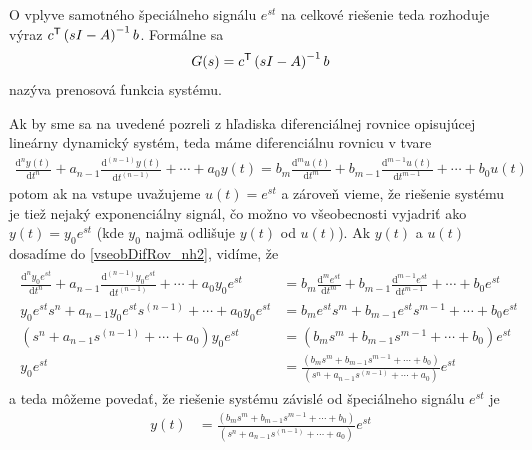 \documentclass[a4paper, 10pt, ]{article}
\begin{document}
O vplyve samotného špeciálneho signálu $e^{st}$ na celkové riešenie teda rozhoduje výraz $c^{\mathsf{T}}  \left( sI - A \right)^{-1}  b$. Formálne sa
\begin{align}
	G(s) = c^{\mathsf{T}}  \left( sI - A \right)^{-1}  b
\end{align}
nazýva prenosová funkcia systému.



\bigskip

Ak by sme sa na uvedené pozreli z hľadiska diferenciálnej rovnice opisujúcej lineárny dynamický systém, teda máme diferenciálnu rovnicu v tvare
\begin{align} \label{vseobDifRov_nh2}
	\frac{\text{d}^n y(t)}{\text{d}t^n} + a_{n-1} \frac{\text{d}^{(n-1)} y(t)}{\text{d}t^{(n-1)}} + \cdots + a_0 y(t) = b_m \frac{\text{d}^m u(t)}{\text{d}t^m} + b_{m-1} \frac{\text{d}^{m-1} u(t)}{\text{d}t^{m-1}} + \cdots + b_0 u(t)
\end{align}
potom ak na vstupe uvažujeme $u(t) = e^{st}$ a zároveň vieme, že riešenie systému je tiež nejaký exponenciálny signál, čo možno vo všeobecnosti vyjadriť ako $y(t) = y_0 e^{st}$ (kde $y_0$ najmä odlišuje $y(t)$ od $u(t)$). Ak $y(t)$ a $u(t)$ dosadíme do \eqref{vseobDifRov_nh2}, vidíme, že
\begin{align}
	\begin{aligned}
			     \frac{\text{d}^n y_0 e^{st}}{\text{d}t^n}
		+ a_{n-1} \frac{\text{d}^{(n-1)} y_0 e^{st}}{\text{d}t^{(n-1)}}
		+ \cdots
		+ a_0 y_0 e^{st}
		&=
		b_m \frac{\text{d}^m e^{st}}{\text{d}t^m}
		+ b_{m-1} \frac{\text{d}^{m-1} e^{st}}{\text{d}t^{m-1}}
		+ \cdots
		+ b_0 e^{st}
		\\
		y_0 e^{st} s^n
		+ a_{n-1}  y_0 e^{st} s^{(n-1)}
		+ \cdots
		+ a_0 y_0 e^{st}
		&=
		b_m  e^{st} s^m
		+ b_{m-1}  e^{st} s^{m-1}
		+ \cdots
		+ b_0 e^{st}
		\\
		\left(
			s^n
			+ a_{n-1}   s^{(n-1)}
			+ \cdots
			+ a_0
		\right)
		y_0 e^{st}
		&=
		\left(
		b_m   s^m
		+ b_{m-1}   s^{m-1}
		+ \cdots
		+ b_0
		\right)
		e^{st}
		\\
		y_0 e^{st}
		&=
		\frac{
		\left(
		b_m   s^m
		+ b_{m-1}   s^{m-1}
		+ \cdots
		+ b_0
		\right)
		}{
		\left(
			s^n
			+ a_{n-1}   s^{(n-1)}
			+ \cdots
			+ a_0
		\right)
		}
		e^{st}
	\end{aligned}
\end{align}
a teda môžeme povedať, že riešenie systému závislé od špeciálneho signálu $e^{st}$ je
\begin{align}
	y(t)
	&=
	\frac{
	\left(
	b_m   s^m
	+ b_{m-1}   s^{m-1}
	+ \cdots
	+ b_0
	\right)
	}{
	\left(
	s^n
	+ a_{n-1}   s^{(n-1)}
	+ \cdots
	+ a_0
	\right)
	}
	e^{st}
\end{align}
\end{document}
